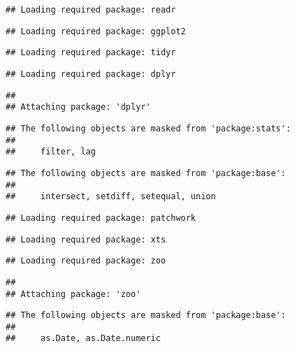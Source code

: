 \documentclass[
]{article}
\begin{document}
\begin{verbatim}
## Loading required package: readr
\end{verbatim}

\begin{verbatim}
## Loading required package: ggplot2
\end{verbatim}

\begin{verbatim}
## Loading required package: tidyr
\end{verbatim}

\begin{verbatim}
## Loading required package: dplyr
\end{verbatim}

\begin{verbatim}
## 
## Attaching package: 'dplyr'
\end{verbatim}

\begin{verbatim}
## The following objects are masked from 'package:stats':
## 
##     filter, lag
\end{verbatim}

\begin{verbatim}
## The following objects are masked from 'package:base':
## 
##     intersect, setdiff, setequal, union
\end{verbatim}

\begin{verbatim}
## Loading required package: patchwork
\end{verbatim}

\begin{verbatim}
## Loading required package: xts
\end{verbatim}

\begin{verbatim}
## Loading required package: zoo
\end{verbatim}

\begin{verbatim}
## 
## Attaching package: 'zoo'
\end{verbatim}

\begin{verbatim}
## The following objects are masked from 'package:base':
## 
##     as.Date, as.Date.numeric
\end{verbatim}
\end{document}
